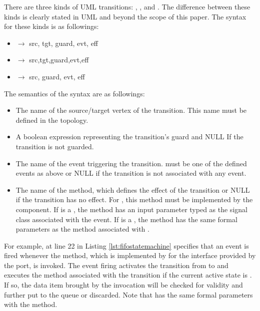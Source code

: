 \vskip 0.2cm
\noindent
{}
There are three kinds of UML transitions: , , and .
The difference between these kinds is clearly stated in UML and beyond the scope of this paper.
The syntax for these kinds is as followings:

\begin{itemize}[\footnotesize]
	\itemsep0em
	\item {} $\rightarrow$  src, tgt, guard, evt, eff \tb{);}
	
	\item {}$\rightarrow$ src,tgt,guard,evt,eff \tb{);}
	
	\item {} $\rightarrow$  src, guard, evt, eff \tb{);}
\end{itemize}

The semantics of the syntax are as followings:
\begin{itemize}[\footnotesize]
	\itemsep0em
	\item {} The name of the source/target vertex of the transition. 
	This name must be defined in the topology.
	
	
	\item {} A boolean expression representing the transition's guard and NULL If the transition is not guarded.
	
	\item {} The name of the event triggering the transition. 
	 must be one of the defined events as above or NULL if the transition is not associated with any event.
	
	\item {} The name of the method, which defines the effect of the transition or NULL if the transition has no effect.
	For , this method must be implemented by the component.
	If  is a , the method has an input parameter typed as the signal class associated with the event.
	If  is a , the method has the same formal parameters as the method associated with .
\end{itemize}


For example,  at line 22 in Listing \ref{lst:fifostatemachine} specifies that an event is fired whenever the  method, which is implemented by  for the  interface provided by the  port, is invoked.
The event firing activates the transition from  to  and executes the  method associated with the transition if the current active state is .
If so, the data item brought by the invocation will be checked for validity and further put to the queue or discarded.
Note that  has the same formal parameters with the  method.

